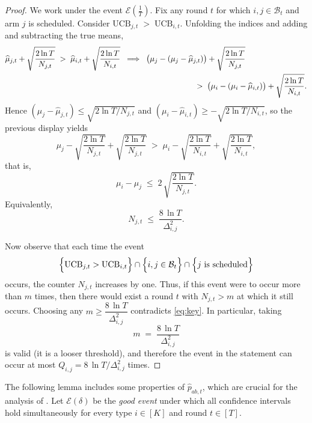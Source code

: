 \begin{proof}
We work under the event $\mathcal{E}\!\left(\frac{1}{T}\right)$. 
Fix any round $t$ for which $i,j\in\mathcal{B}_t$ and arm $j$ is scheduled. Consider $\mathrm{UCB}_{j,t}\;>\;\mathrm{UCB}_{i,t}$.
Unfolding the indices and adding and subtracting the true means,
\begin{align*}
\widehat\mu_{j,t}+\sqrt{\frac{2\ln T}{N_{j,t}}}
\;>\;
\widehat\mu_{i,t}+\sqrt{\frac{2\ln T}{N_{i,t}}}
&\;\;\Longrightarrow\;\;
\bigl(\mu_j-(\mu_j-\widehat\mu_{j,t})\bigr)+\sqrt{\frac{2\ln T}{N_{j,t}}}\\
&\hspace{3.3cm}>\;
\bigl(\mu_i-(\mu_i-\widehat\mu_{i,t})\bigr)+\sqrt{\frac{2\ln T}{N_{i,t}}}.
\end{align*}
Hence $(\mu_j-\widehat\mu_{j,t})\le \sqrt{2\ln T/N_{j,t}}$ and $(\mu_i-\widehat\mu_{i,t})\ge -\sqrt{2\ln T/N_{i,t}}$, so the previous display yields
\[
\mu_j- \sqrt{\frac{2\ln T}{N_{j,t}}}+\sqrt{\frac{2\ln T}{N_{j,t}}}
\;>\;
\mu_i- \sqrt{\frac{2\ln T}{N_{i,t}}}+\sqrt{\frac{2\ln T}{N_{i,t}}},
\]
that is,
\[
\mu_i-\mu_j
\;\le\; 2\,\sqrt{\frac{2\ln T}{N_{j,t}}}.
\]
Equivalently,
\begin{equation}\label{eq:key}
N_{j,t}\;\le\;\frac{8\,\ln T}{\Delta_{i,j}^2}.
\end{equation}

Now observe that each time the event
\[
\Bigl\{\mathrm{UCB}_{j,t}>\mathrm{UCB}_{i,t}\Bigr\}\cap\Bigl\{i,j\in\mathcal{B}_t\Bigr\}\cap\Bigl\{j\text{ is scheduled}\Bigr\}
\]
occurs, the counter $N_{j,t}$ increases by one. Thus, if this event were to occur more than $m$ times, then there would exist a round $t$ with $N_{j,t}>m$ at which it still occurs. Choosing any $m\ge \dfrac{8\,\ln T}{\Delta_{i,j}^2}$ contradicts \eqref{eq:key}. In particular, taking 
\[
m\;=\;\frac{8\,\ln T}{\Delta_{i,j}^2}
\]
is valid (it is a looser threshold), and therefore the event in the statement can occur at most $Q_{i,j}=8\,\ln T/\Delta_{i,j}^2$ times.
\end{proof}
The following lemma includes some properties of $\widehat{p}_{ab,t}$, which are crucial for the analysis of \algrtwo. Let $\mathcal{E}(\delta)$ be the \textit{good event} under which all confidence intervals hold simultaneously for every type $i \in [K]$ and round $t \in [T]$.
